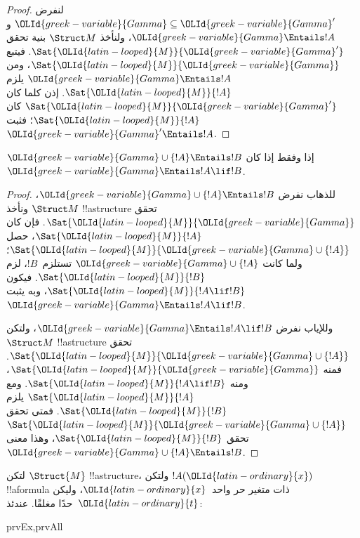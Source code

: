 \documentclass[../../../include/open-logic-section]{subfiles}
\begin{document}
\begin{proof}
لنفرض $\OLId{greek-variable}{Gamma} \subseteq \OLId{greek-variable}{Gamma}'$ و$\OLId{greek-variable}{Gamma} \Entails !A$،
ولنأخذ $\Struct M$ بنية تحقق $\Sat{\OLId{latin-looped}{M}}{\OLId{greek-variable}{Gamma}'}$.
فيتبع $\Sat{\OLId{latin-looped}{M}}{\OLId{greek-variable}{Gamma}}$، ومن $\OLId{greek-variable}{Gamma} \Entails !A$ يلزم
$\Sat{\OLId{latin-looped}{M}}{!A}$. إذن كلما كان $\Sat{\OLId{latin-looped}{M}}{\OLId{greek-variable}{Gamma}'}$ كان
$\Sat{\OLId{latin-looped}{M}}{!A}$؛ فثبت $\OLId{greek-variable}{Gamma}' \Entails !A$.
\end{proof}


\begin{thm}
$\OLId{greek-variable}{Gamma} \cup \{!A\} \Entails !B$ إذا وفقط إذا كان
$\OLId{greek-variable}{Gamma} \Entails !A \lif !B$.
\end{thm}

\begin{proof}
للذهاب نفرض
$\OLId{greek-variable}{Gamma} \cup \{ !A \} \Entails !B$، ونأخذ $\Struct M$
!!a{structure} تحقق $\Sat{\OLId{latin-looped}{M}}{\OLId{greek-variable}{Gamma}}$. فإن كان $\Sat{\OLId{latin-looped}{M}}{!A}$،
حصل $\Sat{\OLId{latin-looped}{M}}{\OLId{greek-variable}{Gamma} \cup \{ !A \} }$؛ ولما كانت
$\OLId{greek-variable}{Gamma} \cup \{ !A \}$ تستلزم~$!B$، لزم $\Sat{\OLId{latin-looped}{M}}{!B}$.
فيكون $\Sat{\OLId{latin-looped}{M}}{!A \lif !B}$، وبه يثبت
$\OLId{greek-variable}{Gamma} \Entails !A \lif !B$.

وللإياب نفرض $\OLId{greek-variable}{Gamma} \Entails !A \lif !B$، ولتكن
$\Struct M$ !!a{structure} تحقق
$\Sat{\OLId{latin-looped}{M}}{\OLId{greek-variable}{Gamma} \cup \{ !A \}}$. فمنه $\Sat{\OLId{latin-looped}{M}}{\OLId{greek-variable}{Gamma}}$،
ومنه $\Sat{\OLId{latin-looped}{M}}{!A \lif !B}$. ومع $\Sat{\OLId{latin-looped}{M}}{!A}$ يلزم
$\Sat{\OLId{latin-looped}{M}}{!B}$. فمتى تحقق
$\Sat{\OLId{latin-looped}{M}}{\OLId{greek-variable}{Gamma} \cup \{ !A \} }$ تحقق $\Sat{\OLId{latin-looped}{M}}{!B}$،
وهذا معنى $\OLId{greek-variable}{Gamma} \cup \{ !A \} \Entails !B$.
\end{proof}

\begin{prop}
  لتكن $\Struct{M}$ !!a{structure}، ولتكن $!A(\OLId{latin-ordinary}{x})$ !!a{formula} ذات
  متغير حر واحد~$\OLId{latin-ordinary}{x}$، وليكن $\OLId{latin-ordinary}{t}$~حدًا مغلقًا. عندئذ:
  \begin{tagenumerate}{prvEx,prvAll}
  \end{tagenumerate}
\end{prop}
\end{document}
